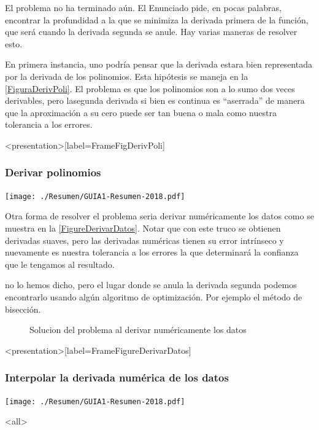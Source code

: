 El problema no ha terminado aún. El Enunciado pide, en pocas palabras,
encontrar la profundidad a la que se minimiza la derivada primera
de la función, que será cuando la derivada segunda se anule.
Hay varias maneras de resolver esto. 

En primera instancia, uno podría pensar que la derivada estara bien
representada por la derivada de los polinomios. Esta hipótesis se 
maneja en la \autoref{FiguraDerivPoli}. El problema es que los
polinomios son a lo sumo dos veces derivables, pero lasegunda derivada
si bien es continua es ``aserrada'' de manera que la aproximación
a su cero puede ser tan buena o mala como nuestra tolerancia a
los errores.

\begin{figure}
  \caption{\protect\label{FiguraDerivPoli}}
\end{figure}

\mode*
\begin{frame}<presentation>[label=FrameFigDerivPoli]
  \frametitle{Derivar polinomios}
  \center
  \texttt{[image: ./Resumen/GUIA1-Resumen-2018.pdf]}

\end{frame}

Otra forma de resolver el problema seria derivar numéricamente los datos
como  se muestra en la \autoref{FigureDerivarDatos}. Notar que con 
este truco se obtienen derivadas suaves, pero las derivadas 
numéricas tienen su error intrínseco y nuevamente es nuestra
tolerancia a los errores la que determinará la confianza que le 
tengamos al resultado. 

no lo hemos dicho, pero el lugar donde se anula la derivada 
segunda podemos encontrarlo usando algún algoritmo 
de optimización. Por ejemplo el método de bisección. 

\begin{figure}
  \caption{\protect\label{FigureDerivarDatos} Solucion del problema al
  derivar numéricamente los datos}
\end{figure}

\mode*
\begin{frame}<presentation>[label=FrameFigureDerivarDatos]
  \frametitle{Interpolar la derivada numérica de los datos}
  \center
  \texttt{[image: ./Resumen/GUIA1-Resumen-2018.pdf]}
\end{frame}

\mode*
 
\mode<all>

